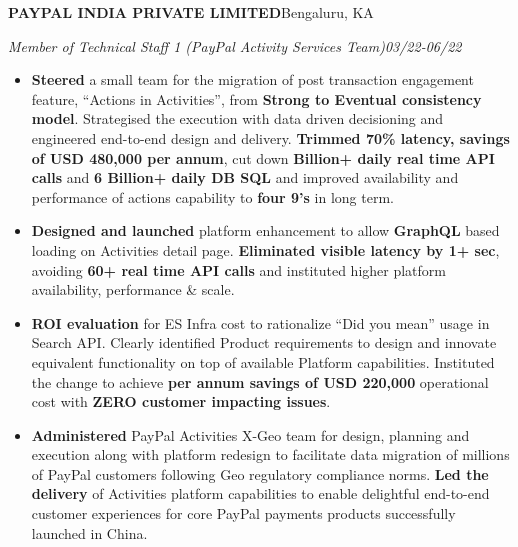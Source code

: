 \documentclass[10pt,letterpaper]{article}
\newlength{\entrygap}      \setlength{\entrygap}{8pt}
\newcommand{\bd}[1]{\textbf{#1}}
\newcommand{\entry}[4]{%
  \par\vspace{\entrygap}%
  \noindent\textbf{#1}\hfill #2\par
  \noindent\textcolor{rolecolor}{\textit{#3}}\hfill\textcolor{rolecolor}{\textit{#4}}\par
  \nopagebreak}
\begin{document}
\entry{PAYPAL INDIA PRIVATE LIMITED}{Bengaluru, KA}
      {Member of Technical Staff 1 (PayPal Activity Services Team)}{03/22-06/22}
\begin{itemize}
\item \bd{Steered} a small team for the migration of post transaction engagement feature,
  ``Actions in Activities'', from \bd{Strong to Eventual consistency model}. Strategised the
  execution with data driven decisioning and engineered end-to-end design and delivery.
  \bd{Trimmed 70\% latency, savings of USD 480,000 per annum}, cut down \bd{Billion+ daily
  real time API calls} and \bd{6 Billion+ daily DB SQL} and improved availability and
  performance of actions capability to \bd{four 9's} in long term.
\item \bd{Designed and launched} platform enhancement to allow \bd{GraphQL} based loading on
  Activities detail page. \bd{Eliminated visible latency by 1+ sec}, avoiding \bd{60+ real
  time API calls} and instituted higher platform availability, performance \& scale.
\item \bd{ROI evaluation} for ES Infra cost to rationalize ``Did you mean'' usage in Search
  API. Clearly identified Product requirements to design and innovate equivalent
  functionality on top of available Platform capabilities. Instituted the change to achieve
  \bd{per annum savings of USD 220,000} operational cost with \bd{ZERO customer impacting
  issues}.
\item \bd{Administered} PayPal Activities X-Geo team for design, planning and execution along
  with platform redesign to facilitate data migration of millions of PayPal customers
  following Geo regulatory compliance norms. \bd{Led the delivery} of Activities platform
  capabilities to enable delightful end-to-end customer experiences for core PayPal
  payments products successfully launched in China.
\end{itemize}
\end{document}
